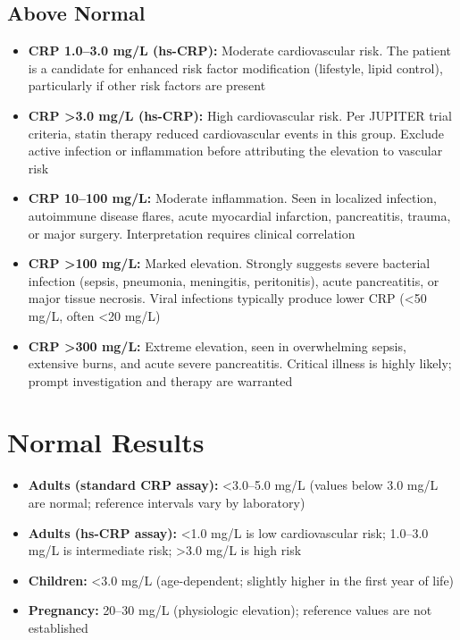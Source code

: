 \subsection*{Above Normal}
\begin{itemize}
  \item \textbf{CRP 1.0--3.0 mg/L (hs-CRP):} Moderate cardiovascular risk. The patient is a candidate for enhanced risk factor modification (lifestyle, lipid control), particularly if other risk factors are present
  \item \textbf{CRP >3.0 mg/L (hs-CRP):} High cardiovascular risk. Per JUPITER trial criteria, statin therapy reduced cardiovascular events in this group. Exclude active infection or inflammation before attributing the elevation to vascular risk
  \item \textbf{CRP 10--100 mg/L:} Moderate inflammation. Seen in localized infection, autoimmune disease flares, acute myocardial infarction, pancreatitis, trauma, or major surgery. Interpretation requires clinical correlation
  \item \textbf{CRP >100 mg/L:} Marked elevation. Strongly suggests severe bacterial infection (sepsis, pneumonia, meningitis, peritonitis), acute pancreatitis, or major tissue necrosis. Viral infections typically produce lower CRP (<50 mg/L, often <20 mg/L)
  \item \textbf{CRP >300 mg/L:} Extreme elevation, seen in overwhelming sepsis, extensive burns, and acute severe pancreatitis. Critical illness is highly likely; prompt investigation and therapy are warranted
\end{itemize}

\section*{Normal Results}
\begin{itemize}
  \item \textbf{Adults (standard CRP assay):} <3.0--5.0 mg/L (values below 3.0 mg/L are normal; reference intervals vary by laboratory)
  \item \textbf{Adults (hs-CRP assay):} <1.0 mg/L is low cardiovascular risk; 1.0--3.0 mg/L is intermediate risk; >3.0 mg/L is high risk
  \item \textbf{Children:} <3.0 mg/L (age-dependent; slightly higher in the first year of life)
  \item \textbf{Pregnancy:} 20--30 mg/L (physiologic elevation); reference values are not established
\end{itemize}

